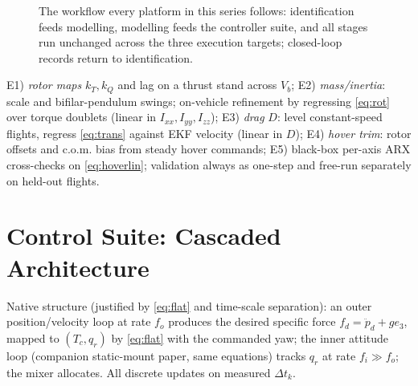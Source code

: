 \documentclass[conference]{IEEEtran}
\begin{document}
\begin{figure}[!t]
\centering
{}
\caption{The workflow every platform in this series follows: identification feeds modelling, modelling feeds the controller suite, and all stages run unchanged across the three execution targets; closed-loop records return to identification.}
\label{fig:workflow}
\end{figure}
E1) \emph{rotor maps} $k_T, k_Q$ and lag on a thrust stand across $V_b$; E2) \emph{mass/inertia}: scale and bifilar-pendulum swings; on-vehicle refinement by regressing \eqref{eq:rot} over torque doublets (linear in $I_{xx},I_{yy},I_{zz}$); E3) \emph{drag} $D$: level constant-speed flights, regress \eqref{eq:trans} against EKF velocity (linear in $D$); E4) \emph{hover trim}: rotor offsets and c.o.m. bias from steady hover commands; E5) black-box per-axis ARX cross-checks on \eqref{eq:hoverlin}; validation always as one-step and free-run separately on held-out flights.

\section{Control Suite: Cascaded Architecture}
Native structure (justified by \eqref{eq:flat} and time-scale separation): an outer position/velocity loop at rate $f_o$ produces the desired specific force $f_d = \ddot p_d + g e_3$, mapped to $(T_c, q_r)$ by \eqref{eq:flat} with the commanded yaw; the inner attitude loop (companion static-mount paper, same equations) tracks $q_r$ at rate $f_i \gg f_o$; the mixer allocates. All discrete updates on measured $\Delta t_k$.
\end{document}
